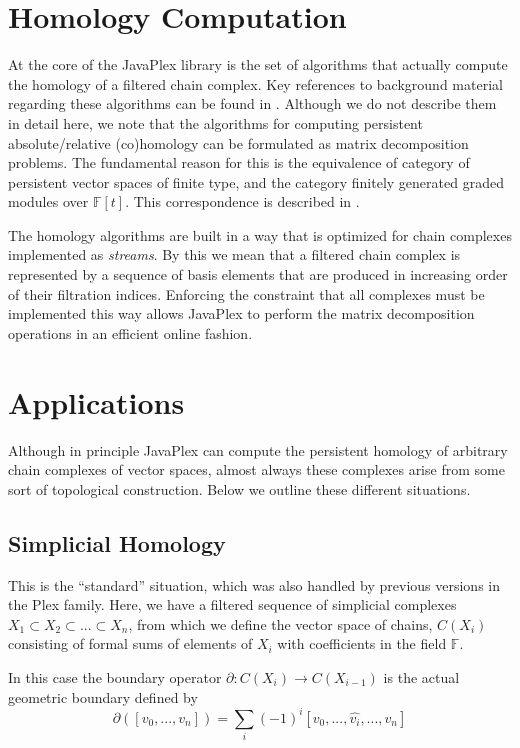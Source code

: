 \documentclass[10pt]{article}
\begin{document}
\section{Homology Computation}

At the core of the JavaPlex library is the set of algorithms that actually compute the homology of a filtered chain complex. Key references to background material regarding these algorithms can be found in \cite{Carlsson_04, Dualities}. Although we do not describe them in detail here, we note that the algorithms for computing persistent absolute/relative (co)homology can be formulated as matrix decomposition problems. The fundamental reason for this is the equivalence of category of persistent vector spaces of finite type, and the category finitely generated graded modules over $\mathbb{F}[t]$. This correspondence is described in \cite{Carlsson_04}. 

The homology algorithms are built in a way that is optimized for chain complexes implemented as \emph{streams}. By this we mean that a filtered chain complex is represented by a sequence of basis elements that are produced in increasing order of their filtration indices. Enforcing the constraint that all complexes must be implemented this way allows JavaPlex to perform the matrix decomposition operations in an efficient online fashion.

\section{Applications}

Although in principle JavaPlex can compute the persistent homology of arbitrary chain complexes of vector spaces, almost always these complexes arise from some sort of topological construction. Below we outline these different situations.

\subsection{Simplicial Homology}

This is the ``standard'' situation, which was also handled by previous versions in the Plex family. Here, we have a filtered sequence of simplicial complexes $X_1 \subset X_2 \subset ... \subset X_n$, from which we define the vector space of chains, $C(X_i)$ consisting of formal sums of elements of $X_i$ with coefficients in the field $\mathbb{F}$.

In this case the boundary operator $\partial: C(X_i) \rightarrow C(X_{i-1})$ is the actual geometric boundary defined by
$$\partial([v_0, ..., v_n]) = \sum_i (-1)^i [v_0, ..., \hat{v_i}, ..., v_n]$$
\end{document}
